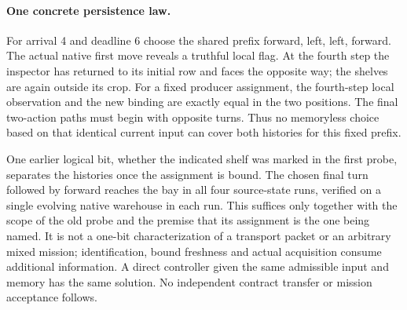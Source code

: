 \documentclass{article}
\begin{document}
\paragraph{One concrete persistence law.}
For arrival 4 and deadline 6 choose the shared prefix
forward, left, left, forward. The actual native first move
reveals a truthful local flag. At the fourth step the inspector
has returned to its initial row and faces the opposite way;
the shelves are again outside its crop. For a fixed producer
assignment, the fourth-step local observation and the new
binding are exactly equal in the two positions. The final
two-action paths must begin with opposite turns. Thus no
memoryless choice based on that identical current input
can cover both histories for this fixed prefix.

One earlier logical bit, whether the indicated shelf was
marked in the first probe, separates the histories once the
assignment is bound. The chosen final turn followed by
forward reaches the bay in all four source-state runs,
verified on a single evolving native warehouse in each run.
This suffices only together with the scope of the old probe
and the premise that its assignment is the one being named.
It is not a one-bit characterization of a transport packet
or an arbitrary mixed mission; identification, bound freshness
and actual acquisition consume additional information.
A direct controller given the same admissible input and
memory has the same solution. No independent contract
transfer or mission acceptance follows.
\end{document}
